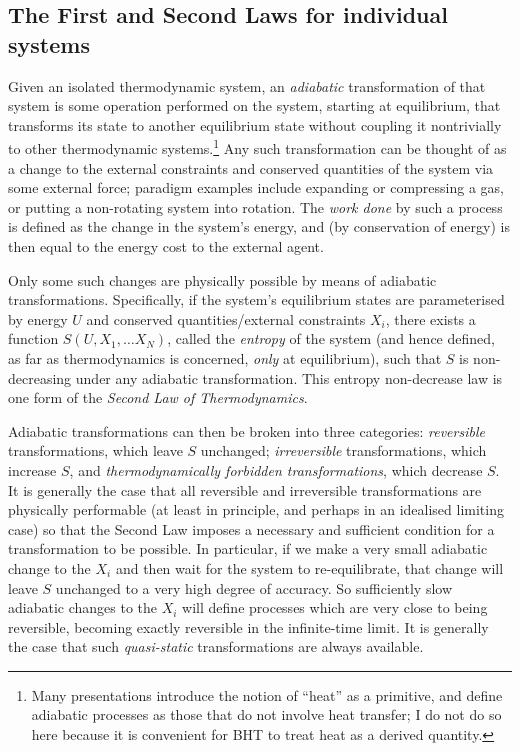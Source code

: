 \documentclass[12pt]{article}
\begin{document}
\subsection{The First and Second Laws for individual systems}\label{firstsecondlaw}

Given an isolated thermodynamic system, an \emph{adiabatic} transformation of that system is some operation performed on the system, starting at equilibrium, that transforms its state to another equilibrium state without coupling it nontrivially to other thermodynamic systems.\footnote{Many presentations introduce the notion of ``heat'' as a primitive, and define adiabatic processes as those that do not involve heat transfer; I do not do so here because it is convenient for BHT to treat heat as a derived quantity.} Any such transformation can be thought of as a change to the external constraints and conserved quantities of the system via some external force; paradigm examples include expanding or compressing  a gas, or putting a non-rotating system into rotation.  The \emph{work done} by such a process is defined as the change in the system's energy, and (by conservation of energy) is then equal to the energy cost to the external agent.

Only some such changes are physically possible by means of adiabatic transformations. Specifically, if the system's equilibrium states are parameterised by energy $U$ and conserved quantities/external constraints $X_i$, there exists a function $S(U,X_1,\ldots X_N)$, called the \emph{entropy} of the system (and hence defined, as far as thermodynamics is concerned, \emph{only} at equilibrium), such that $S$ is non-decreasing under any adiabatic transformation. This entropy non-decrease law is one form of the \emph{Second Law of Thermodynamics}. 

Adiabatic transformations can then be broken into three categories: \emph{reversible} transformations, which leave $S$ unchanged; \emph{irreversible} transformations, which increase $S$, and \emph{thermodynamically forbidden transformations}, which decrease $S$. It is generally the case that all reversible and irreversible transformations are physically performable (at least in principle, and perhaps in an idealised limiting case) so that the Second Law imposes a necessary and sufficient condition for a transformation to be possible. In particular, if we make a very small adiabatic change to the $X_i$ and then wait for the system to re-equilibrate, that change will leave $S$ unchanged to a very high degree of accuracy. So sufficiently slow adiabatic changes to the $X_i$ will define processes which are very close to being reversible, becoming exactly reversible in the infinite-time limit. It is generally the case that such \emph{quasi-static} transformations are always available.
\end{document}
